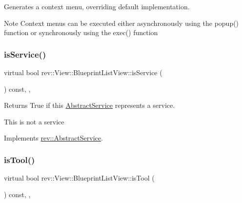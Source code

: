 Generates a context menu, overriding default implementation. 

\begin{DoxyNote}{Note}
Context menus can be executed either asynchronously using the popup() function or synchronously using the exec() function 
\end{DoxyNote}
\mbox{\label{classrev_1_1_view_1_1_blueprint_list_view_a7f8fad1a94d496b12dcfb2066de06f48}} 
\subsubsection{\texorpdfstring{isService()}{isService()}}
{\footnotesize\ttfamily virtual bool rev\+::\+View\+::\+Blueprint\+List\+View\+::is\+Service (\begin{DoxyParamCaption}{ }\end{DoxyParamCaption}) const\hspace{0.3cm}{\ttfamily [inline]}, {\ttfamily [override]}, {\ttfamily [virtual]}}



Returns True if this \mbox{\hyperlink{classrev_1_1_abstract_service}{Abstract\+Service}} represents a service. 

This is not a service 

Implements \mbox{\hyperlink{classrev_1_1_abstract_service_a2ee1ad1b9d10a1d702d0a484e214b99d}{rev\+::\+Abstract\+Service}}.

\mbox{\label{classrev_1_1_view_1_1_blueprint_list_view_aa3ae7a92fc6bf701aec067392f93d2a7}} 
\subsubsection{\texorpdfstring{isTool()}{isTool()}}
{\footnotesize\ttfamily virtual bool rev\+::\+View\+::\+Blueprint\+List\+View\+::is\+Tool (\begin{DoxyParamCaption}{ }\end{DoxyParamCaption}) const\hspace{0.3cm}{\ttfamily [inline]}, {\ttfamily [override]}, {\ttfamily [virtual]}}



